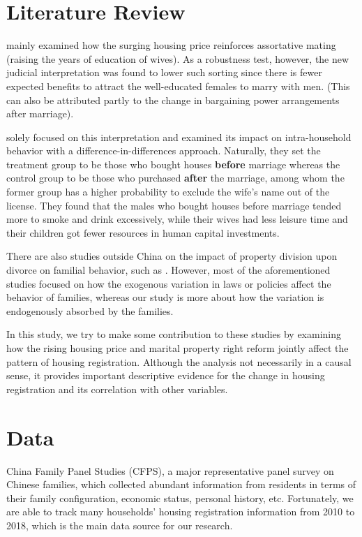 \documentclass[11pt]{article}
\begin{document}
\section{Literature Review} \label{sec:literature}
\citet{SUN2020102492} mainly examined how the surging housing price reinforces assortative mating (raising the years of education of wives). As a robustness test, however, the new judicial interpretation was found to lower such sorting since there is fewer expected benefits to attract the well-educated females to marry with men. (This can also be attributed partly to the change in bargaining power arrangements after marriage).

\citet{Huang532} solely focused on this interpretation and examined its impact on intra-household behavior 
with a difference-in-differences approach. Naturally, they set the treatment group to be those who bought houses \textbf{before} marriage whereas the control group to be those who purchased \textbf{after} the marriage, among whom the former group has a higher probability to exclude the wife's name out of the license. They found that the males who bought houses before marriage tended more to smoke and drink excessively, while their wives had less leisure time and their children got fewer resources in human capital investments.

There are also studies outside China on the impact of property division upon divorce on familial behavior, such as \citet{grayDivorceLawChangesHousehold1998}. However, most of the aforementioned studies focused on how the exogenous variation in laws or policies affect the behavior of families, whereas our study is more about how the variation is endogenously absorbed by the families.

In this study, we try to make some contribution to these studies by examining how the rising housing price and marital property right reform jointly affect the pattern of housing registration. Although the analysis not necessarily in a causal sense, it provides important descriptive evidence for the change in housing registration and its correlation with other variables.


\section{Data} \label{sec:data}

China Family Panel Studies (CFPS), a major representative panel survey on Chinese families, which collected abundant information from residents in terms of their family configuration, economic status, personal history, etc. Fortunately, we are able to track many households' housing registration information from 2010 to 2018, which is the main data source for our research.
\end{document}
